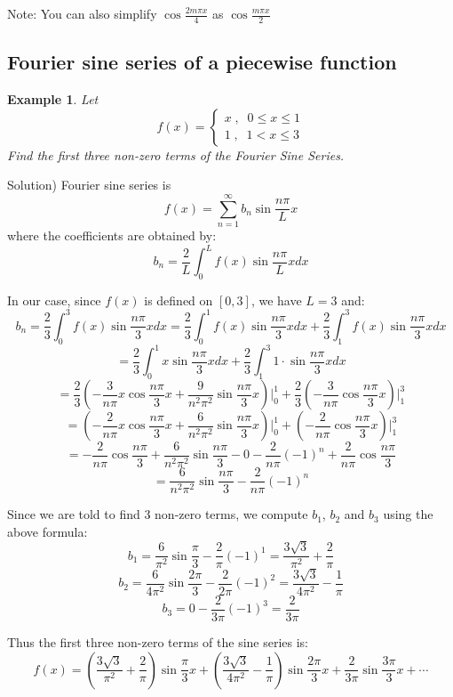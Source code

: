 \documentclass[12pt]{report}
\newtheorem{ex}{Example}[section]
\begin{document}
Note: You can also simplify $\cos \frac{2m\pi x}{4}$ as $\cos \frac{m\pi x}{2}$

\subsection*{Fourier sine series of a piecewise function }

\begin{ex} Let
$$f(x) = \begin{cases} x  \; , \; \; 0\leq x \leq 1 \\ 1  \; , \; \; 1<x\leq 3 \end{cases}$$
Find the first three non-zero terms of the Fourier Sine Series.
\end{ex}

Solution)
Fourier sine series is
$$f(x) = \sum_{n=1}^{\infty}  b_n \sin \frac{n\pi}{L} x  $$
where the coefficients are obtained by:
$$b_n = \frac{2}{L} \int_{0}^{L} f(x) \sin \frac{n\pi}{L} x dx$$

In our case, since $f(x)$ is defined on $[0,3]$, we have $L=3$ and:
$$b_n = \frac{2}{3} \int_{0}^{3} f(x) \sin \frac{n\pi}{3} x dx = \frac{2}{3} \int_{0}^{1} f(x) \sin \frac{n\pi}{3} x dx +\frac{2}{3} \int_{1}^{3} f(x) \sin \frac{n\pi}{3} x dx $$
$$= \frac{2}{3} \int_{0}^{1} x \sin \frac{n\pi}{3} x dx +\frac{2}{3} \int_{1}^{3} 1 \cdot \sin \frac{n\pi}{3} x dx $$
$$ = \frac{2}{3} \left(-\frac{3}{n\pi} x \cos \frac{n\pi}{3} x + \frac{9}{n^2\pi^2}  \sin \frac{n\pi}{3} x \right) \Bigg\vert_0^1 + \frac{2}{3} \left(-\frac{3}{n\pi} \cos \frac{n\pi}{3} x \right) \Bigg\vert_1^3$$
$$= \left(-\frac{2}{n\pi} x \cos \frac{n\pi}{3} x + \frac{6}{n^2\pi^2}  \sin \frac{n\pi}{3} x \right) \Bigg\vert_0^1 +\left(-\frac{2}{n\pi} \cos \frac{n\pi}{3} x \right) \Bigg\vert_1^3$$
$$ = -\frac{2}{n\pi} \cos \frac{n\pi}{3} +\frac{6}{n^2\pi^2} \sin \frac{n\pi}{3} -0 -\frac{2}{n\pi} (-1)^n + \frac{2}{n\pi} \cos \frac{n\pi}{3}$$
$$ = \frac{6}{n^2\pi^2} \sin \frac{n\pi}{3} -\frac{2}{n\pi} (-1)^n$$

Since we are told to find 3 non-zero terms, we compute $b_1$, $b_2$ and $b_3$ using the above formula:
$$b_1 = \frac{6}{\pi^2} \sin \frac{\pi}{3} - \frac{2}{\pi}(-1)^1 = \frac{3\sqrt{3}}{\pi^2}+\frac{2}{\pi}$$
$$b_2=  \frac{6}{4\pi^2} \sin \frac{2\pi}{3} - \frac{2}{2\pi}(-1)^2 = \frac{3\sqrt{3}}{4\pi^2}-\frac{1}{\pi}$$
$$b_3 = 0 - \frac{2}{3\pi}(-1)^3= \frac{2}{3\pi}$$

Thus the first three non-zero terms of the sine series is:
$$f(x) = \left(\frac{3\sqrt{3}}{\pi^2}+\frac{2}{\pi} \right)\sin \frac{\pi}{3} x + \left( \frac{3\sqrt{3}}{4\pi^2}-\frac{1}{\pi} \right) \sin \frac{2\pi}{3} x + \frac{2}{3\pi}\sin \frac{3\pi}{3} x +\cdots$$
\end{document}
